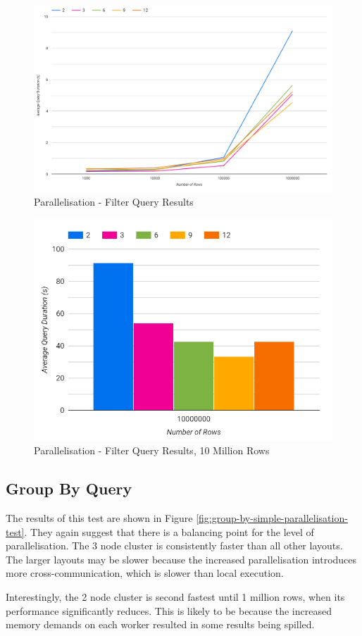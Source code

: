 \begin{figure}[ht]
	\centering
	\includegraphics[width=0.8\linewidth]{chapters/diagrams/testing/filter-simple-parallelisation-test}
	\caption{Parallelisation - Filter Query Results}
	\label{fig:filter-simple-parallelisation-test}
\end{figure}

\begin{figure}[ht]
	\centering
	\includegraphics[width=0.4\linewidth]{chapters/diagrams/testing/filter-simple-parallelisation-10m}
	\caption{Parallelisation - Filter Query Results, 10 Million Rows}
	\label{fig:filter-simple-parallelisation-10m}
\end{figure}

\pagebreak
\subsection{Group By Query}
The results of this test are shown in Figure \ref{fig:group-by-simple-parallelisation-test}. They again suggest that there is a balancing point for the level of parallelisation. The 3 node cluster is consistently faster than all other layouts. The larger layouts may be slower because the increased parallelisation introduces more cross-communication, which is slower than local execution.

Interestingly, the 2 node cluster is second fastest until 1 million rows, when its performance significantly reduces. This is likely to be because the increased memory demands on each worker resulted in some results being spilled.

